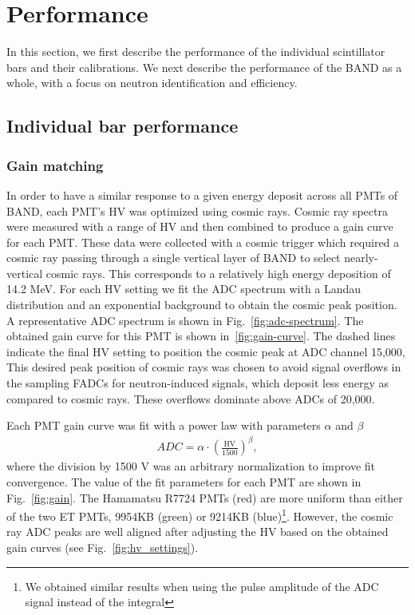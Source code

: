 \documentclass[3p,final,twocolumn]{elsarticle}
\begin{document}
\section{Performance}
In this section, we first describe the performance of the individual scintillator bars and their calibrations. We next describe the performance
of the BAND as a whole, with a focus on neutron identification and efficiency.

\subsection{Individual bar performance}
\subsubsection{Gain matching}
In order to have a similar response to a given energy deposit across all PMTs of BAND, each PMT's HV was optimized using cosmic rays. Cosmic
ray spectra were measured with a range of HV and then combined to produce a gain curve for each PMT. These data were
collected with a cosmic trigger which required a cosmic ray passing through a single vertical layer of BAND to select nearly-vertical
cosmic rays. This corresponds to a relatively high energy deposition of 14.2 \si{\mega\eV}. For each HV setting we fit the ADC spectrum
with a Landau distribution and an exponential background to obtain the cosmic peak position. A representative ADC spectrum is shown in
Fig.~\ref{fig:adc-spectrum}.  The obtained gain curve for this PMT is shown in~\ref{fig:gain-curve}. The dashed lines indicate the final HV
setting to position the cosmic peak at ADC channel 15,000, This desired peak
 position of cosmic rays was chosen to avoid signal overflows in the sampling FADCs for neutron-induced signals, which deposit less energy as compared to cosmic rays. These overflows dominate above ADCs of 20,000. 

Each PMT gain curve was fit with a power law with parameters $\alpha$ and $\beta$
\begin{eqnarray}
	ADC	= \alpha \cdot \left(\frac{\mathrm{HV}}{1500}\right)^{\beta},				
		\label{eqn:gain_curve}
\end{eqnarray}
where the division by 1500 \si{\volt} was an arbitrary normalization to improve fit convergence. The value of the fit parameters for each PMT are
shown in Fig.~\ref{fig:gain}. The Hamamatsu R7724 PMTs (red) are more uniform than either of the two ET PMTs, 9954KB (green) or
9214KB (blue)\footnote{We obtained similar results when using the pulse amplitude of the ADC signal instead of the integral}. 
However, the cosmic ray ADC peaks are well aligned after adjusting the HV based on the obtained gain curves (see Fig.~\ref{fig:hv_settings}).
\end{document}
